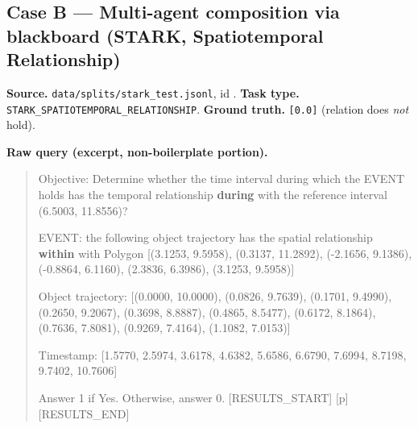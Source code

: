 \subsection{Case B --- Multi-agent composition via blackboard (STARK, Spatiotemporal Relationship)}
\label{app:case_b}

\textbf{Source.} \texttt{data/splits/stark\_test.jsonl}, id \texttt{}.
\textbf{Task type.} \texttt{STARK\_SPATIOTEMPORAL\_RELATIONSHIP}.
\textbf{Ground truth.} \texttt{[0.0]} (relation does \emph{not} hold).

\textbf{Raw query (excerpt, non-boilerplate portion).}
\begin{quote}\small\ttfamily
Objective: Determine whether the time interval during which the EVENT holds has the temporal relationship \textbf{during} with the reference interval (6.5003, 11.8556)?

EVENT: the following object trajectory has the spatial relationship \textbf{within} with Polygon [(3.1253, 9.5958), (0.3137, 11.2892), (-2.1656, 9.1386), (-0.8864, 6.1160), (2.3836, 6.3986), (3.1253, 9.5958)]

Object trajectory: [(0.0000, 10.0000), (0.0826, 9.7639), (0.1701, 9.4990), (0.2650, 9.2067), (0.3698, 8.8887), (0.4865, 8.5477), (0.6172, 8.1864), (0.7636, 7.8081), (0.9269, 7.4164), (1.1082, 7.0153)]

Timestamp: [1.5770, 2.5974, 3.6178, 4.6382, 5.6586, 6.6790, 7.6994, 8.7198, 9.7402, 10.7606]

Answer 1 if Yes. Otherwise, answer 0.
[RESULTS\_START] [p] [RESULTS\_END]
\end{quote}

